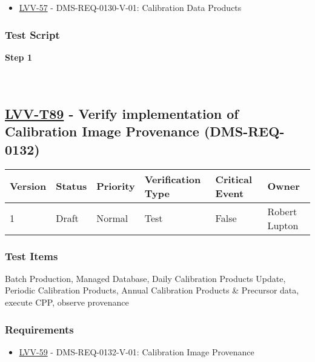 \begin{itemize}
\tightlist
\item
  \href{https://jira.lsstcorp.org/browse/LVV-57}{LVV-57} -
  DMS-REQ-0130-V-01: Calibration Data Products
\end{itemize}

\hypertarget{test-script-65}{%
\subsubsection{Test Script}\label{test-script-65}}

\textbf{Step 1}\\
~\\
~\\

\hypertarget{lvv-t89---verify-implementation-of-calibration-image-provenance-dms-req-0132}{%
\subsection{\texorpdfstring{\href{https://jira.lsstcorp.org/secure/Tests.jspa\#/testCase/LVV-T89}{LVV-T89}
- Verify implementation of Calibration Image Provenance
(DMS-REQ-0132)}{LVV-T89 - Verify implementation of Calibration Image Provenance (DMS-REQ-0132)}}\label{lvv-t89---verify-implementation-of-calibration-image-provenance-dms-req-0132}}

\begin{longtable}[]{@{}llllll@{}}
\toprule
Version & Status & Priority & Verification Type & Critical Event &
Owner\tabularnewline
\midrule
\endhead
1 & Draft & Normal & Test & False & Robert Lupton\tabularnewline
\bottomrule
\end{longtable}

\hypertarget{test-items-65}{%
\subsubsection{Test Items}\label{test-items-65}}

Batch Production, Managed Database, Daily Calibration Products Update,
Periodic Calibration Products, Annual Calibration Products \& Precursor
data, execute CPP, observe provenance

\hypertarget{requirements-66}{%
\subsubsection{Requirements}\label{requirements-66}}

\begin{itemize}
\tightlist
\item
  \href{https://jira.lsstcorp.org/browse/LVV-59}{LVV-59} -
  DMS-REQ-0132-V-01: Calibration Image Provenance
\end{itemize}

